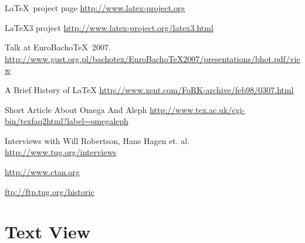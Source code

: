 \begin{thebibliography}{10}
{\LaTeX\ project page}
\newblock \url{http://www.latex-project.org}

{\LaTeX3 project}
\newblock \url{http://www.latex-project.org/latex3.html}

\vspace{2ex}
\vspace{1ex}
\newblock Talk at EuroBacho\TeX\ 2007.\\
\newblock \url{http://www.gust.org.pl/bachotex/EuroBachoTeX2007/presentations/bhot.pdf/view}

{A Brief History of \LaTeX}
\newblock \url{http://www.xent.com/FoRK-archive/feb98/0307.html}

{Short Article About Omega And Aleph}
\newblock \url{http://www.tex.ac.uk/cgi-bin/texfaq2html?label=omegaleph}

{Interviews with Will Robertson, Hans Hagen et. al.}
\newblock \url{http://www.tug.org/interviews}

\vspace{2ex}
\vspace{1ex}

\newblock \url{http://www.ctan.org}

\newblock \url{ftp://ftp.tug.org/historic}
\end{thebibliography}

\clearpage
\section{Text View}
\label{sec:text}

